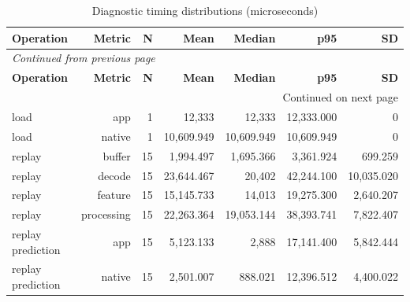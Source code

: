 \documentclass[10pt,a4paper]{article}
\begin{document}
\begingroup\small\setlength{\tabcolsep}{4pt}\renewcommand{\arraystretch}{1.12}
\begin{longtable}{@{}lrrrrrr@{}}
\caption{Diagnostic timing distributions (microseconds)}\\
\toprule
\textbf{Operation} & \textbf{Metric} & \textbf{N} & \textbf{Mean} & \textbf{Median} & \textbf{p95} & \textbf{SD} \\
\midrule\endfirsthead
\multicolumn{7}{l}{\small\itshape Continued from previous page}\\
\toprule
\textbf{Operation} & \textbf{Metric} & \textbf{N} & \textbf{Mean} & \textbf{Median} & \textbf{p95} & \textbf{SD} \\
\midrule\endhead
\midrule\multicolumn{7}{r}{\small Continued on next page}\\\endfoot
\bottomrule\endlastfoot
load & app & 1 & 12,333 & 12,333 & 12,333.000 & 0 \\
load & native & 1 & 10,609.949 & 10,609.949 & 10,609.949 & 0 \\
replay & buffer & 15 & 1,994.497 & 1,695.366 & 3,361.924 & 699.259 \\
replay & decode & 15 & 23,644.467 & 20,402 & 42,244.100 & 10,035.020 \\
replay & feature & 15 & 15,145.733 & 14,013 & 19,275.300 & 2,640.207 \\
replay & processing & 15 & 22,263.364 & 19,053.144 & 38,393.741 & 7,822.407 \\
replay prediction & app & 15 & 5,123.133 & 2,888 & 17,141.400 & 5,842.444 \\
replay prediction & native & 15 & 2,501.007 & 888.021 & 12,396.512 & 4,400.022 \\
\end{longtable}\endgroup
\end{document}
